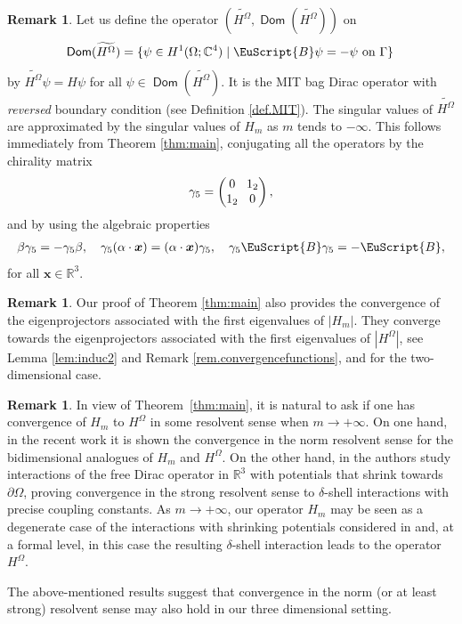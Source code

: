 \documentclass[10pt]{amsart}
\let\mathcal \EuScript
\newcommand{\cB}{\mathcal{B}}
\let\sep\mid
\theoremstyle{plain}
\theoremstyle{definition}
\newtheorem{remark}[theorem]{Remark}
\newcommand{\RR}{\mathbb{R}}
\newcommand{\bx}{{\boldsymbol x}}
\DeclareMathOperator{\Dom}{\mathsf{Dom}}
\begin{document}
\begin{remark}\label{rem.opplimit}
Let us define the operator $(\widetilde{H^\Omega},\Dom(\widetilde{H^\Omega}))$ on
\[
\Dom(\widetilde{H^\Omega}) = \{\psi\in H^1(\Omega;\mathbb{C}^4)\sep\cB\psi = -\psi~\text{on}~\Gamma\}\,
\]
by $\widetilde{H^\Omega}\psi=H\psi$ for all $\psi\in\Dom(\widetilde{H^\Omega})$. It is the MIT bag Dirac operator with \emph{reversed} boundary condition (see Definition \ref{def.MIT}). The singular values of $\widetilde{H^\Omega}$ are approximated by the singular values of $H_m$ as $m$ tends to $-\infty$. This follows immediately from Theorem \ref{thm:main}, conjugating all the operators by the chirality matrix
\[\arraycolsep3.5pt
\gamma_5=\begin{pmatrix}0&1_2\\1_2&0\end{pmatrix},
\]
and by using the algebraic properties
\begin{equation*}
\begin{split}
\beta \gamma_5 = -\gamma_5\beta,\quad
\gamma_5(\alpha\cdot \bx) = (\alpha\cdot \bx)\gamma_5,\quad
\gamma_5\cB\gamma_5 = -\cB,
\end{split}
\end{equation*}
for all $\bx\in\RR^3$.
\end{remark}
\begin{remark}
Our proof of Theorem \ref{thm:main} also provides the convergence of the eigenprojectors associated with the first eigenvalues of $|H_m|$. They converge towards the eigenprojectors associated with the first eigenvalues of $|H^\Omega|$, see Lemma \ref{lem:induc2} and Remark \ref{rem.convergencefunctions}, and \cite[Th.\,1]{stockmeyer2016infinite} for the two-dimensional case.
\end{remark}
\begin{remark}
In view of Theorem~\ref{thm:main}, it is natural to ask if one has convergence of $H_m$ to $H^\Omega$ in some resolvent sense when $m\to+\infty$. On one hand, in the recent work \cite{barbaroux2018normconvergence} it is shown the convergence in the norm resolvent sense for the bidimensional analogues of $H_m$ and $H^\Omega$. On the other hand, in \cite{maspizzichillo2018} the authors study interactions of the free Dirac operator in $\RR^3$ with potentials that shrink towards $\partial\Omega$, proving convergence in the strong resolvent sense to $\delta$-shell interactions with precise coupling constants. As $m\to+\infty$, our operator $H_m$ may be seen as a degenerate case of the interactions with shrinking potentials considered in \cite{maspizzichillo2018} and, at a formal level, in this case the resulting $\delta$-shell interaction leads to the operator $H^\Omega$.

The above-mentioned results suggest that convergence in the norm (or at least strong) resolvent sense may also hold in our three dimensional setting.
\end{remark}
\end{document}
